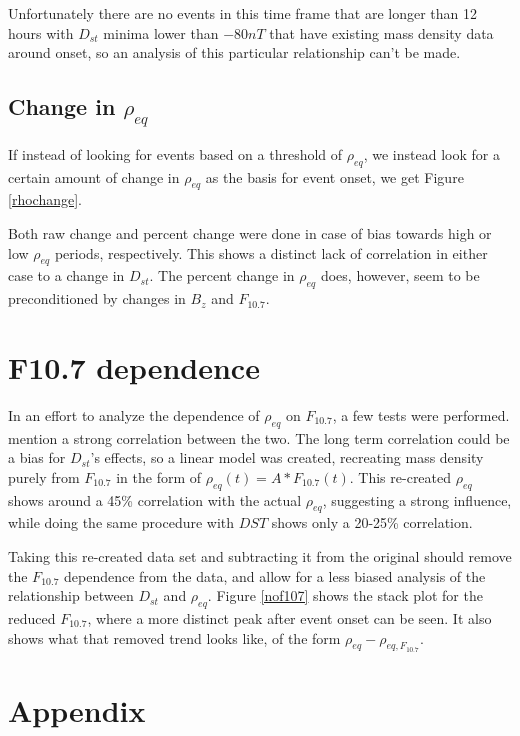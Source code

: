 \documentclass[10pt,twocolumn]{article}
\begin{document}
Unfortunately there are no events in this time frame that are longer than 12 hours with $D_{st}$ minima lower than $-80nT$ that have existing mass density data around onset, so an analysis of this particular relationship can't be made.

\subsection{Change in $\rho_{eq}$}
If instead of looking for events based on a threshold of $\rho_{eq}$, we instead look for a certain amount of change in $\rho_{eq}$ as the basis for event onset, we get Figure \ref{rhochange}.



Both raw change and percent change were done in case of bias towards high or low $\rho_{eq}$ periods, respectively. This shows a distinct lack of correlation in either case to a change in $D_{st}$. The percent change in $\rho_{eq}$ does, however, seem to be preconditioned by changes in $B_z$ and $F_{10.7}$.



\section{F10.7 dependence}
In an effort to analyze the dependence of $\rho_{eq}$ on $F_{10.7}$, a few tests were performed. \cite{Takahashi2010} mention a strong correlation between the two. The long term correlation could be a bias for $D_{st}$'s effects, so a linear model was created, recreating mass density purely from $F_{10.7}$ in the form of $\rho_{eq}(t)=A*F_{10.7}(t)$. This re-created $\rho_{eq}$ shows around a 45\% correlation with the actual $\rho_{eq}$, suggesting a strong influence, while doing the same procedure with $DST$ shows only a 20-25\% correlation. 

Taking this re-created data set and subtracting it from the original should remove the $F_{10.7}$ dependence from the data, and allow for a less biased analysis of the relationship between $D_{st}$ and $\rho_{eq}$. Figure \ref{nof107} shows the stack plot for the reduced $F_{10.7}$, where a more distinct peak after event onset can be seen. It also shows what that removed trend looks like, of the form $\rho_{eq}-\rho_{eq,F_{10.7}}$.

\section{Appendix}
\end{document}
